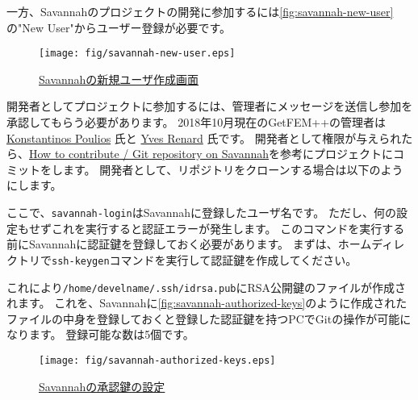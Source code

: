 \documentclass{../../style/ltjoc}
\begin{document}
一方、Savannahのプロジェクトの開発に参加するには\autoref{fig:savannah-new-user}の"New User"からユーザー登録が必要です。
%
\begin{figure}[htbp]
\centering
\texttt{[image: fig/savannah-new-user.eps]}
\caption{\href{https://savannah.gnu.org/account/register.php}{Savannahの新規ユーザ作成画面}}
\label{fig:savannah-new-user}
\end{figure}
開発者としてプロジェクトに参加するには、管理者にメッセージを送信し参加を承認してもらう必要があります。
2018年10月現在のGetFEM++の管理者は \href{http://www.dtu.dk/english/service/phonebook/person?id=65472&tab=2&qt=dtupublicationquery}{Konstantinos Poulios} 氏と \href{http://math.univ-lyon1.fr/~renard/}{Yves Renard} 氏です。
開発者として権限が与えられたら、\href{http://getfem.org/project/index.html}{How to contribute / Git repository on Savannah}を参考にプロジェクトにコミットをします。
開発者として、リポジトリをクローンする場合は以下のようにします。
\begin{shbox}
\end{shbox}
ここで、\texttt{savannah-login}はSavannahに登録したユーザ名です。
ただし、何の設定もせずこれを実行すると認証エラーが発生します。
このコマンドを実行する前にSavannahに認証鍵を登録しておく必要があります。
まずは、ホームディレクトリで\texttt{ssh-keygen}コマンドを実行して認証鍵を作成してください。
\begin{shbox}
  \shline{}{}
\end{shbox}
これにより\texttt{/home/develname/.ssh/id\textunderscore{}rsa.pub}にRSA公開鍵のファイルが作成されます。
これを、Savannahに\autoref{fig:savannah-authorized-keys}のように作成されたファイルの中身を登録しておくと登録した認証鍵を持つPCでGitの操作が可能になります。
登録可能な数は5個です。
\begin{figure}[htbp]
\centering
\texttt{[image: fig/savannah-authorized-keys.eps]}
\caption{\href{https://savannah.gnu.org/my/admin/editsshkeys.php}{Savannahの承認鍵の設定}}
\label{fig:savannah-authorized-keys}
\end{figure}
\end{document}
